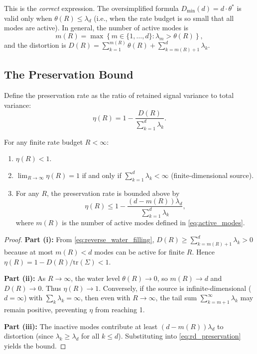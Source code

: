 This is the \emph{correct} expression. The oversimplified formula $D_{\min}(d) = d \cdot \theta^*$ is valid only when $\theta(R) \leq \lambda_d$ (i.e., when the rate budget is so small that all modes are active). In general, the number of active modes is
\begin{equation}\label{eq:active_modes}
m(R) = \max\left\{m \in \{1, \ldots, d\} : \lambda_m > \theta(R)\right\},
\end{equation}
and the distortion is $D(R) = \sum_{k=1}^{m(R)} \theta(R) + \sum_{k=m(R)+1}^{d} \lambda_k$.

\subsection{The Preservation Bound}

Define the preservation rate as the ratio of retained signal variance to total variance:
\begin{equation}\label{eq:rd_preservation}
\eta(R) = 1 - \frac{D(R)}{\sum_{k=1}^{d} \lambda_k}.
\end{equation}

\begin{proposition}\label{prop:rd_bound}
For any finite rate budget $R < \infty$:
\begin{enumerate}[label=(\roman*)]
\item $\eta(R) < 1$.
\item $\lim_{R \to \infty} \eta(R) = 1$ if and only if $\sum_{k=1}^{d} \lambda_k < \infty$ (finite-dimensional source).
\item For any $R$, the preservation rate is bounded above by
\begin{equation}\label{eq:rd_eta_bound}
\eta(R) \leq 1 - \frac{(d - m(R)) \lambda_d}{\sum_{k=1}^{d} \lambda_k},
\end{equation}
where $m(R)$ is the number of active modes defined in \eqref{eq:active_modes}.
\end{enumerate}
\end{proposition}

\begin{proof}
\textbf{Part (i):} From \eqref{eq:reverse_water_filling}, $D(R) \geq \sum_{k=m(R)+1}^{d} \lambda_k > 0$ because at most $m(R) < d$ modes can be active for finite $R$. Hence $\eta(R) = 1 - D(R) / \text{tr}(\Sigma) < 1$.

\textbf{Part (ii):} As $R \to \infty$, the water level $\theta(R) \to 0$, so $m(R) \to d$ and $D(R) \to 0$. Thus $\eta(R) \to 1$. Conversely, if the source is infinite-dimensional ($d = \infty$) with $\sum_k \lambda_k = \infty$, then even with $R \to \infty$, the tail sum $\sum_{k=m+1}^{\infty} \lambda_k$ may remain positive, preventing $\eta$ from reaching 1.

\textbf{Part (iii):} The inactive modes contribute at least $(d - m(R)) \lambda_d$ to distortion (since $\lambda_k \geq \lambda_d$ for all $k \leq d$). Substituting into \eqref{eq:rd_preservation} yields the bound.
\end{proof}

